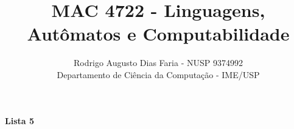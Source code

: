 \documentclass[12pt]{article}
\begin{document}
\title{MAC 4722 - Linguagens, Autômatos e Computabilidade}
\author{Rodrigo Augusto Dias Faria - NUSP 9374992\\
Departamento de Ciência da Computação - IME/USP}

\maketitle

\begin{comment}
\begin{center}
\textbf{\large{Lista 1}}
\end{center}




\begin{center}
\textbf{\large{Lista 2}}
\end{center}





\begin{center}
\textbf{\large{Lista 3}}
\end{center}





\begin{center}
\textbf{\large{Lista 4}}
\end{center}






\end{comment}

\begin{center}
\textbf{\large{Lista 5}}
\end{center}





\printbibliography
\end{document}
